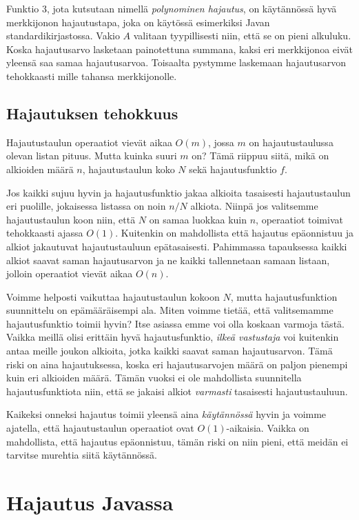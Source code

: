 Funktio 3, jota kutsutaan nimellä \emph{polynominen hajautus},
on käytännössä hyvä merkkijonon hajautustapa, joka on käytössä esimerkiksi
Javan standardikirjastossa.
Vakio $A$ valitaan tyypillisesti niin, että se on pieni alkuluku.
Koska hajautusarvo lasketaan painotettuna summana,
kaksi eri merkkijonoa eivät yleensä saa samaa hajautusarvoa.
Toisaalta pystymme laskemaan hajautusarvon tehokkaasti
mille tahansa merkkijonolle.

\subsection{Hajautuksen tehokkuus}

Hajautustaulun operaatiot vievät aikaa $O(m)$,
jossa $m$ on hajautustaulussa olevan listan pituus.
Mutta kuinka suuri $m$ on? Tämä riippuu siitä,
mikä on alkioiden määrä $n$, hajautustaulun koko $N$
sekä hajautusfunktio $f$.

Jos kaikki sujuu hyvin ja hajautusfunktio jakaa alkioita
tasaisesti hajautustaulun eri puolille,
jokaisessa listassa on noin $n/N$ alkiota.
Niinpä jos valitsemme hajautustaulun koon niin,
että $N$ on samaa luokkaa kuin $n$,
operaatiot toimivat tehokkaasti ajassa $O(1)$.
Kuitenkin on mahdollista että hajautus epäonnistuu
ja alkiot jakautuvat hajautustauluun epätasaisesti.
Pahimmassa tapauksessa kaikki alkiot saavat saman
hajautusarvon ja ne kaikki tallennetaan samaan listaan,
jolloin operaatiot vievät aikaa $O(n)$.

Voimme helposti vaikuttaa hajautustaulun kokoon $N$,
mutta hajautusfunktion suunnittelu on epämääräisempi ala.
Miten voimme tietää, että valitsemamme hajautusfunktio
toimii hyvin?
Itse asiassa emme voi olla koskaan varmoja tästä.
Vaikka meillä olisi erittäin hyvä hajautusfunktio,
\emph{ilkeä vastustaja} voi kuitenkin antaa
meille joukon alkioita, jotka kaikki saavat saman hajautusarvon.
Tämä riski on aina hajautuksessa, koska eri
hajautusarvojen määrä on paljon pienempi kuin eri alkioiden määrä.
Tämän vuoksi ei ole mahdollista suunnitella hajautusfunktiota niin,
että se jakaisi alkiot \emph{varmasti} tasaisesti hajautustauluun.

Kaikeksi onneksi hajautus toimii yleensä aina \emph{käytännössä}
hyvin ja voimme ajatella, että hajautustaulun operaatiot ovat
$O(1)$-aikaisia.
Vaikka on mahdollista, että hajautus epäonnistuu,
tämän riski on niin pieni, että meidän ei tarvitse murehtia
siitä käytännössä.

\section{Hajautus Javassa}

